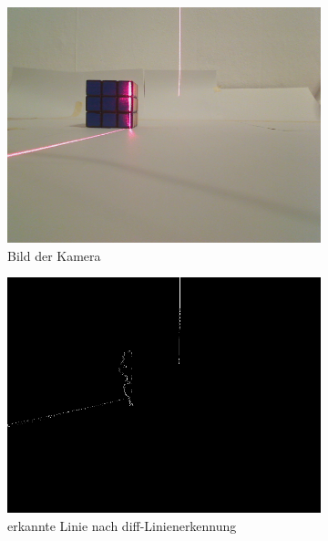 \documentclass[ngerman,a4paper,parskip=half]{scrartcl}
\begin{document}
\begin{figure}[H]
	\centering
	\begin{subfigure}{0.32\textwidth}
		\includegraphics[width=\textwidth]{includes/blue_t.png}
		\caption{Bild der Kamera\\}
		\label{fig:blue_t_cam}
	\end{subfigure}
	\hfill
	\begin{subfigure}{0.32\textwidth}
		\includegraphics[width=\textwidth]{includes/blue_t_diff.png}
		\caption{erkannte Linie nach diff-Linienerkennung}
		\label{fig:blue_t_diff}
	\end{subfigure}
	\hfill
	\begin{subfigure}{0.32\textwidth}

\end{subfigure}
\end{figure}
\end{document}
